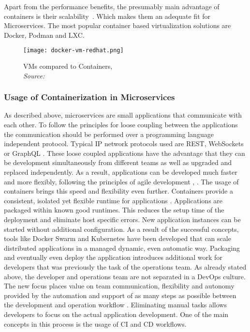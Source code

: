 \documentclass[12pt, a4paper]{article}
\begin{document}
        Apart from the performance benefits, the presumably main advantage of containers is their scalability~\cite{cintainer_scale}. Which makes them an adequate fit for Microservices. The most popular container based virtualization solutions are Docker, Podman and LXC.

        \begin{figure}
            \centering
            \texttt{[image: docker-vm-redhat.png]}
            \caption{\ac{VM}s compared to Containers, \\\textit{Source:~\cite{redhat_pic}}}\label{fig::vm_docker}
        \end{figure}

        \subsubsection{Usage of Containerization in Microservices}
        As described above, microservices are small applications that communicate with each other. To follow the principles for loose coupling between the applications the communication should be performed over a programming language independent protocol. Typical \acs{IP} network protocols used are \ac{REST}, WebSockets or GraphQL \cite{micro}. These loose coupled applications have the advantage that they can be development simultaneously from different teams as well as upgraded and replaced independently. As a result, applications can be developed much faster and more flexibly, following the principles of agile development \cite{micro}, \cite{redhat_micro}.\newline
        The usage of containers brings this speed and flexibility even further. Containers provide a consistent, isolated yet flexible runtime for applications \cite{micro_container}. Applications are packaged within known good runtimes. This reduces the setup time of the deployment and eliminate host specific errors. New application instances can be started without additional configuration. As a result of the successful concepts, tools like Docker Swarm and Kubernetes have been developed that can scale distributed applications in a managed dynamic, even automatic way.\newline
        \noindent Packaging and eventually even deploy the application introduces additional work for developers that was previously the task of the operations team. As already stated above, the developer and operations team are not separated in a DevOps culture. The new focus places value on team communication, flexibility and autonomy provided by the automation and support of as many steps as possible between the development and operation workflow \cite{effective_devops}. Eliminating manual tasks allows developers to focus on the actual application development. One of the main concepts in this process is the usage of \ac{CI} and \ac{CD} workflows.
\end{document}
